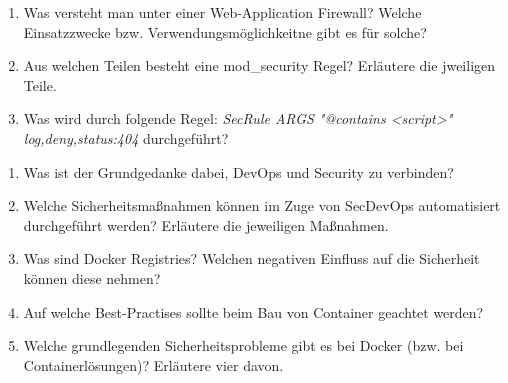 \begin{enumerate}
	\item Was versteht man unter einer Web-Application Firewall? Welche Einsatzzwecke bzw. Verwendungsmöglichkeitne gibt es für solche?
	\item Aus welchen Teilen besteht eine mod\_security Regel? Erläutere die jweiligen Teile.
	\item Was wird durch folgende Regel: \textit{SecRule ARGS "@contains <script>" log,deny,status:404} durchgeführt?
\end{enumerate}

\begin{enumerate}
	\item Was ist der Grundgedanke dabei, DevOps und Security zu verbinden?
	\item Welche Sicherheitsmaßnahmen können im Zuge von SecDevOps automatisiert durchgeführt werden? Erläutere die jeweiligen Maßnahmen.
	\item Was sind Docker Registries? Welchen negativen Einfluss auf die Sicherheit können diese nehmen?
	\item Auf welche Best-Practises sollte beim Bau von Container geachtet werden?
	\item Welche grundlegenden Sicherheitsprobleme gibt es bei Docker (bzw. bei Containerlösungen)? Erläutere vier davon.
\end{enumerate}
